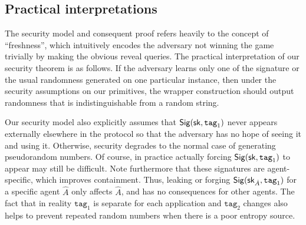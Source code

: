 \documentclass{article}
\begin{document}
\subsection{Practical interpretations}
The security model and consequent proof refers heavily to the concept of ``freshness'', which intuitively encodes the adversary not winning the game trivially by making the obvious reveal queries. The practical interpretation of our security theorem is as follows. If the adversary learns only one of the signature or the usual randomness generated on one particular instance, then under the security assumptions on our primitives, the wrapper construction should output randomness that is indistinguishable from a random string.

Our security model also explicitly assumes that $\mathsf{Sig} (\mathsf{sk}, \texttt{tag}_1)$ never appears externally elsewhere in
the protocol so that the adversary has no hope of seeing it and using it. Otherwise, security degrades to the normal case of generating pseudorandom numbers. Of course, in practice actually
forcing $\mathsf{Sig} (\mathsf{sk}, \texttt{tag}_1)$ to appear may still be difficult.  Note furthermore that these
signatures are agent-specific, which improves containment. Thus, leaking
or forging $\mathsf{Sig} (\mathsf{sk}_{\hat A}, \texttt{tag}_1)$ for a specific agent $\hat A$ only affects $\hat A$, and
has no consequences for other agents.  The fact that in reality $\texttt{tag}_1$ is separate for each application and $\texttt{tag}_2$ changes also helps to prevent repeated random numbers when there is a poor entropy source. 



\end{document}
